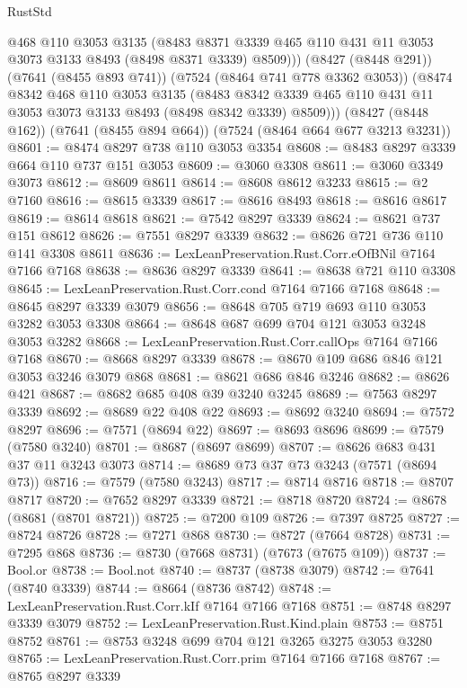\begin{lexlean}{RustStd}
\begin{coremodule}
          @468
          @110
          @3053
          @3135
          (@8483 @8371 @3339 @465 @110 @431 @11 @3053 @3073 @3133 @8493 (@8498 @8371 @3339) @8509)))
      (@8427 (@8448 @291))
      (@7641 (@8455 @893 @741))
      (@7524 (@8464 @741 @778 @3362 @3053))
      (@8474
        @8342
        @468
        @110
        @3053
        @3135
        (@8483 @8342 @3339 @465 @110 @431 @11 @3053 @3073 @3133 @8493 (@8498 @8342 @3339) @8509)))
    (@8427 (@8448 @162))
    (@7641 (@8455 @894 @664))
    (@7524 (@8464 @664 @677 @3213 @3231))
@8601 := @8474 @8297 @738 @110 @3053 @3354
@8608 := @8483 @8297 @3339 @664 @110 @737 @151 @3053
@8609 := @3060 @3308
@8611 := @3060 @3349 @3073
@8612 := @8609 @8611
@8614 := @8608 @8612 @3233
@8615 := @2 @7160
@8616 := @8615 @3339
@8617 := @8616 @8493
@8618 := @8616 @8617
@8619 := @8614 @8618
@8621 := @7542 @8297 @3339
@8624 := @8621 @737 @151 @8612
@8626 := @7551 @8297 @3339
@8632 := @8626 @721 @736 @110 @141 @3308 @8611
@8636 := LexLeanPreservation.Rust.Corr.eOfBNil @7164 @7166 @7168
@8638 := @8636 @8297 @3339
@8641 := @8638 @721 @110 @3308
@8645 := LexLeanPreservation.Rust.Corr.cond @7164 @7166 @7168
@8648 := @8645 @8297 @3339 @3079
@8656 := @8648 @705 @719 @693 @110 @3053 @3282 @3053 @3308
@8664 := @8648 @687 @699 @704 @121 @3053 @3248 @3053 @3282
@8668 := LexLeanPreservation.Rust.Corr.callOps @7164 @7166 @7168
@8670 := @8668 @8297 @3339
@8678 := @8670 @109 @686 @846 @121 @3053 @3246 @3079 @868
@8681 := @8621 @686 @846 @3246
@8682 := @8626 @421
@8687 := @8682 @685 @408 @39 @3240 @3245
@8689 := @7563 @8297 @3339
@8692 := @8689 @22 @408 @22
@8693 := @8692 @3240
@8694 := @7572 @8297
@8696 := @7571 (@8694 @22)
@8697 := @8693 @8696
@8699 := @7579 (@7580 @3240)
@8701 := @8687 (@8697 @8699)
@8707 := @8626 @683 @431 @37 @11 @3243 @3073
@8714 := @8689 @73 @37 @73 @3243 (@7571 (@8694 @73))
@8716 := @7579 (@7580 @3243)
@8717 := @8714 @8716
@8718 := @8707 @8717
@8720 := @7652 @8297 @3339
@8721 := @8718 @8720
@8724 := @8678 (@8681 (@8701 @8721))
@8725 := @7200 @109
@8726 := @7397 @8725
@8727 := @8724 @8726
@8728 := @7271 @868
@8730 := @8727 (@7664 @8728)
@8731 := @7295 @868
@8736 := @8730 (@7668 @8731) (@7673 (@7675 @109))
@8737 := Bool.or
@8738 := Bool.not
@8740 := @8737 (@8738 @3079)
@8742 := @7641 (@8740 @3339)
@8744 := @8664 (@8736 @8742)
@8748 := LexLeanPreservation.Rust.Corr.kIf @7164 @7166 @7168
@8751 := @8748 @8297 @3339 @3079
@8752 := LexLeanPreservation.Rust.Kind.plain
@8753 := @8751 @8752
@8761 := @8753 @3248 @699 @704 @121 @3265 @3275 @3053 @3280
@8765 := LexLeanPreservation.Rust.Corr.prim @7164 @7166 @7168
@8767 := @8765 @8297 @3339

\end{coremodule}
\end{lexlean}
